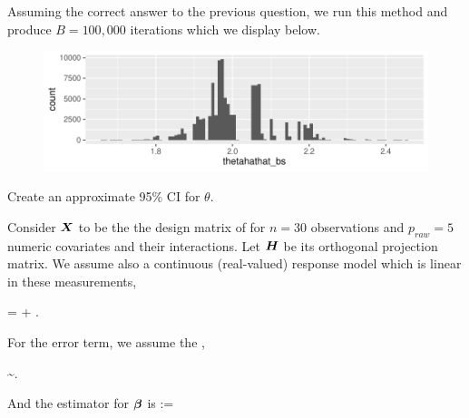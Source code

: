 \documentclass[12pt]{article}
\begin{document}
\begin{enumerate}[(a)]

Assuming the correct answer to the previous question, we run this method and produce $B = 100,000$ iterations which we display below. 

\vspace{-0.2cm}
\begin{figure}[htp]
\centering
\includegraphics[width=6.0in]{bootstraps}
\end{figure}
\FloatBarrier
\vspace{-0.7cm}

 Create an approximate 95\% CI for $\theta$.  \\


\pagebreak
\end{enumerate}

\problem Consider $\boldsymbol{X}$ to be the the design matrix of for $n = 30$ observations and $p_{raw} = 5$ numeric covariates and their interactions. Let $\boldsymbol{H}$ be its orthogonal projection matrix. We assume also a continuous (real-valued) response model which is linear in these measurements,

\vspace{-0.2cm}
\beqn
\Y = \X\bbeta + \berrorrv.
\eeqn

\noindent For the error term, we assume the ,

\vspace{-0.2cm}
\beqn
\berrorrv \sim {}.
\eeqn

\noindent And the estimator for $\boldsymbol{\beta}$ is
\beqn
\B := \XtXinvXt \Y 
\eeqn
\end{document}
